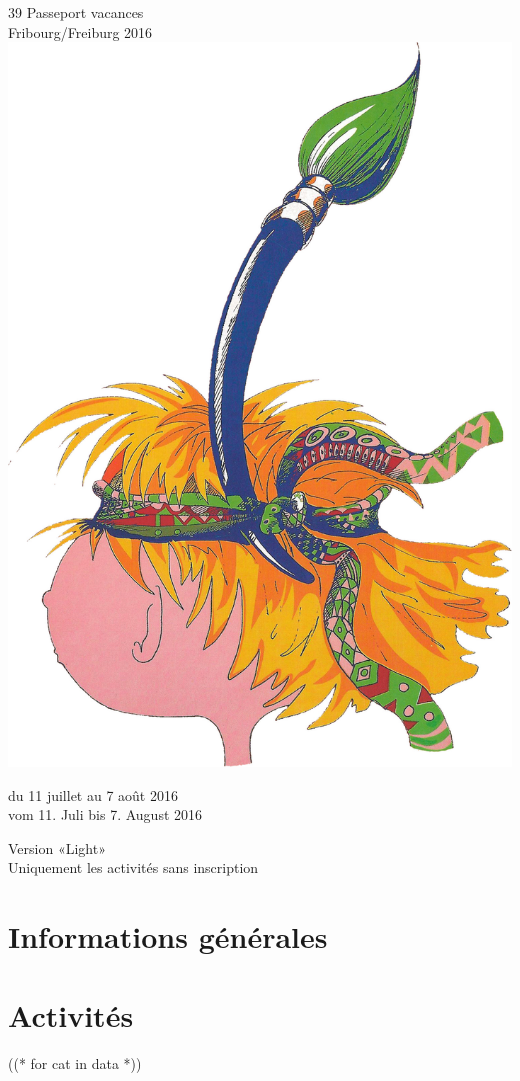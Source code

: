 \documentclass [parskip=full, paper=a4paper]{scrbook}
\begin{document}
\frontmatter
\begin{titlepage}
\begin{center}
{\fontsize{45}{40}\selectfont{}39\ieme{} Passeport vacances\\
\vspace*{3mm}
Fribourg/Freiburg 2016}
\vfill
\includegraphics[width=.55\textwidth]{logo.jpg}
\vfill

{\fontsize{32}{32}\selectfont{}du 11 juillet au 7 août 2016}\\
\vspace*{3mm}
{\fontsize{32}{32}\selectfont{}vom 11. Juli bis 7. August 2016}
\vspace*{1cm}

{
\color{red}
{\fontsize{32}{32}\selectfont{}Version «Light»}\\
\vspace*{3mm}
{\fontsize{24}{24}\selectfont{}Uniquement les activités sans inscription}
}

\end{center}
\end{titlepage}
\clearpage

\cleardoublepage
\tableofcontents
\cleardoublepage

\mainmatter

\part{Informations générales}



\part{Activités}
((* for cat in data *))
\end{document}
